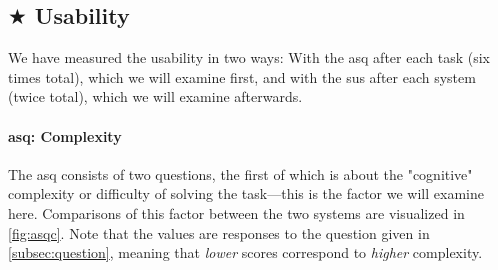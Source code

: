 \documentclass[../thesis]{subfiles}
\begin{document}
\subsection[Usability]{$\bigstar$ Usability}
We have measured the usability in two ways:
With the \gls{asq} after each task (six times total), which we will examine first, and with the \gls{sus} after each system (twice total), which we will examine afterwards.

\paragraph{\gls{asq}: Complexity}
The \gls{asq} consists of two questions, the first of which is about the "cognitive" complexity or difficulty of solving the task---this is the factor we will examine here.
Comparisons of this factor between the two systems are visualized in \cref{fig:asqc}.
Note that the values are  responses to the question given in \cref{subsec:question}, meaning that \emph{lower} scores correspond to \emph{higher} complexity.
\end{document}
